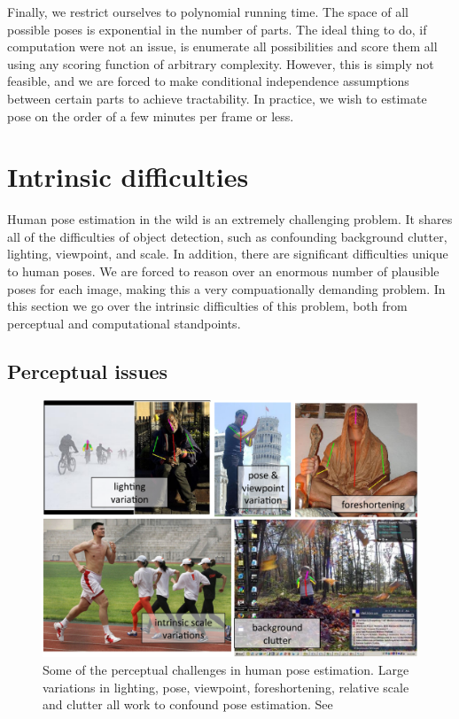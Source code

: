 Finally, we restrict ourselves to polynomial running time.  The space of all 
possible poses is exponential in the number of parts. The 
ideal thing to do, if computation were not an issue, is enumerate all 
possibilities and score them all using any scoring function of arbitrary 
complexity. However, this is simply not feasible, and we are forced to make 
conditional independence assumptions between certain parts to achieve 
tractability.  In practice, we wish to estimate pose on the order of a few 
minutes per frame or less.

\section{Intrinsic difficulties}
Human pose estimation in the wild is an extremely challenging problem.  It 
shares all of the difficulties of object detection, such as confounding 
background clutter, lighting, viewpoint, and scale. In addition, there are 
significant difficulties unique to human poses.  We are forced to reason over 
an enormous number of plausible poses for each image, making this a very 
compuationally demanding problem.  In this section we go over the intrinsic 
difficulties of this problem, both from perceptual and computational 
standpoints.

\subsection{Perceptual issues}\label{sec:perceptual}
\begin{figure}[tb]
\begin{center}
\includegraphics[width=1.05\textwidth]{figs/perceptual-issues.pdf}
\caption[Perceptual difficulties in pose estimation]{Some of the perceptual 
challenges in human pose estimation.  Large variations in lighting, pose, 
viewpoint, foreshortening, relative scale and clutter all work to confound pose 
estimation.  See~}
\label{fig:perceptual-issues}
\end{center}
\end{figure}

